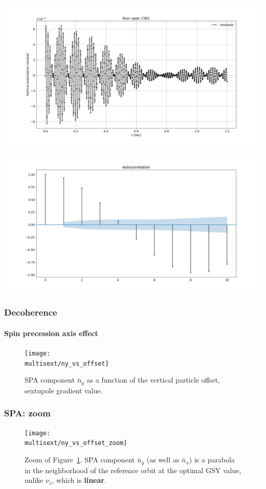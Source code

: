 \documentclass{beamer}
\newcommand{\home}{\string~}
\newcommand{\Artem}{\home/REPOS/COSYINF/img/Artem}
\newcommand{\multisext}{\Artem/multisext_test}
\begin{document}
\begin{frame}
  \centering
  \includegraphics[height=.5\paperheight, trim=0 25 0 25, clip]{RESID_VS_TIME}
  
  \includegraphics[height=.5\paperheight, trim=0 25 0 25, clip]{RESID_AUTOCORR}
\end{frame}

\begin{frame}\frametitle{Decoherence} \framesubtitle{Spin precession axis effect}
  \begin{figure}[H]
    \centering
    \texttt{[image: \\multisext/ny\_vs\_offset]}
    \caption{SPA component $\bar n_y$ as a function of the vertical particle offset, sextupole gradient value.\label{fig:DECOH_full_ny}}
  \end{figure}
\end{frame}

\begin{frame}\frametitle{SPA: zoom}
  \begin{figure}[H]
    \texttt{[image: \\multisext/ny\_vs\_offset\_zoom]}
    \caption{Zoom of Figure~\ref{fig:DECOH_full_ny}. SPA component $\bar
      n_y$ (as well as $\bar n_x$) is a parabola in the neighborhood of the reference orbit at
      the optimal GSY value, unlike $\nu_s$, which is \textbf{linear}.}
  \end{figure}
\end{frame}
\end{document}
